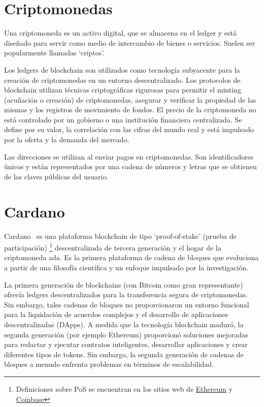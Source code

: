 \documentclass[12pt]{book}
\begin{document}
\section{Criptomonedas}

Una criptomoneda es un activo digital, que se almacena en el ledger y está diseñado para servir como medio de intercambio de bienes o servicios. Suelen ser popularmente llamadas `criptos'.

Los ledgers de blockchain son utilizados como tecnología subyacente para la creación de criptomonedas en un entorno descentralizado. Los protocolos de blockchain utilizan técnicas criptográficas rigurosas para permitir el minting (acuñación o creación) de criptomonedas, asegurar y verificar la propiedad de las mismas y los registros de movimiento de fondos. El precio de la criptomoneda no está controlado por un gobierno o una institución financiera centralizada. Se define por su valor, la correlación con las cifras del mundo real y está impulsado por la oferta y la demanda del mercado.

Las direcciones se utilizan al enviar pagos en criptomonedas. Son identificadores únicos y están representados por una cadena de números y letras que se obtienen de las claves públicas del usuario.

\section{Cardano}

Cardano~\cite{cardano_docs} es una plataforma blockchain de tipo `proof-of-stake' (prueba de participación)
\footnote{Definiciones sobre PoS se encuentran en los sitios web de \href{https://ethereum.org/en/developers/docs/consensus-mechanisms/pos/}{Ethereum} y \href{https://www.coinbase.com/es/learn/crypto-basics/what-is-proof-of-work-or-proof-of-stake}{Coinbase}}
descentralizada de tercera generación y el hogar de la criptomoneda ada. Es la primera plataforma de cadena de bloques que evoluciona a partir de una filosofía científica y un enfoque impulsado por la investigación.

La primera generación de blockchains (con Bitcoin como gran representante) ofrecía ledgers descentralizados para la transferencia segura de criptomonedas. Sin embargo, tales cadenas de bloques no proporcionaron un entorno funcional para la liquidación de acuerdos complejos y el desarrollo de aplicaciones descentralizadas (DApps). A medida que la tecnología blockchain maduró, la segunda generación (por ejemplo Ethereum) proporcionó soluciones mejoradas para redactar y ejecutar contratos inteligentes, desarrollar aplicaciones y crear diferentes tipos de tokens. Sin embargo, la segunda generación de cadenas de bloques a menudo enfrenta problemas en términos de escalabilidad.
\end{document}
